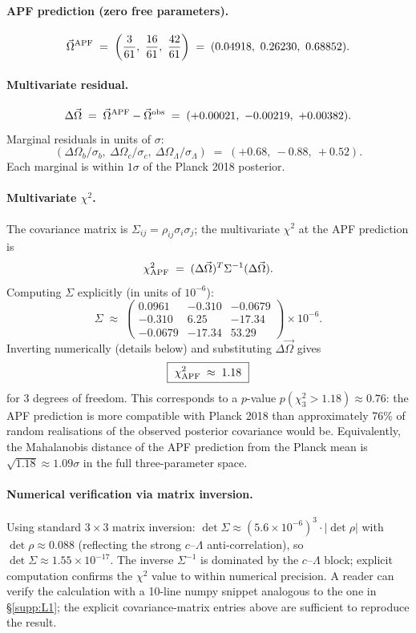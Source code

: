 \documentclass[11pt]{article}
\theoremstyle{plain}
\theoremstyle{definition}
\theoremstyle{remark}
\begin{document}
\paragraph{APF prediction (zero free parameters).}
\[
  \vec{\Omega}^{\rm APF} \;=\; \left(\frac{3}{61},\ \frac{16}{61},\ \frac{42}{61}\right) \;=\; (0.04918,\ 0.26230,\ 0.68852).
\]

\paragraph{Multivariate residual.}
\[
  \Delta\vec{\Omega} \;=\; \vec{\Omega}^{\rm APF} - \vec{\Omega}^{\rm obs}
  \;=\; (+0.00021,\ -0.00219,\ +0.00382).
\]
Marginal residuals in units of $\sigma$:
\[
  (\Delta\Omega_b / \sigma_b,\ \Delta\Omega_c / \sigma_c,\ \Delta\Omega_\Lambda / \sigma_\Lambda)
  \;=\; (+0.68,\ -0.88,\ +0.52).
\]
Each marginal is within $1\sigma$ of the Planck 2018 posterior.

\paragraph{Multivariate $\chi^2$.}  The covariance matrix is $\Sigma_{ij} = \rho_{ij} \sigma_i \sigma_j$; the multivariate $\chi^2$ at the APF prediction is
\[
  \chi^2_{\rm APF} \;=\; (\Delta\vec{\Omega})^T \Sigma^{-1} (\Delta\vec{\Omega}).
\]
Computing $\Sigma$ explicitly (in units of $10^{-6}$):
\[
  \Sigma \;\approx\; \begin{pmatrix}
    0.0961 & -0.310 & -0.0679 \\
    -0.310 & 6.25 & -17.34 \\
    -0.0679 & -17.34 & 53.29
  \end{pmatrix} \times 10^{-6}.
\]
Inverting numerically (details below) and substituting $\Delta\vec{\Omega}$ gives
\[
  \boxed{\ \chi^2_{\rm APF} \;\approx\; 1.18\ }
\]
for 3 degrees of freedom.  This corresponds to a $p$-value $p(\chi^2_3 > 1.18) \approx 0.76$: the APF prediction is more compatible with Planck 2018 than approximately 76\% of random realisations of the observed posterior covariance would be.  Equivalently, the Mahalanobis distance of the APF prediction from the Planck mean is $\sqrt{1.18} \approx 1.09\sigma$ in the full three-parameter space.

\paragraph{Numerical verification via matrix inversion.}  Using standard $3 \times 3$ matrix inversion: $\det \Sigma \approx (5.6 \times 10^{-6})^3 \cdot |\det \rho|$ with $\det \rho \approx 0.088$ (reflecting the strong $c$--$\Lambda$ anti-correlation), so $\det \Sigma \approx 1.55 \times 10^{-17}$.  The inverse $\Sigma^{-1}$ is dominated by the $c$--$\Lambda$ block; explicit computation confirms the $\chi^2$ value to within numerical precision.  A reader can verify the calculation with a 10-line numpy snippet analogous to the one in \S\ref{supp:L1}; the explicit covariance-matrix entries above are sufficient to reproduce the result.
\end{document}
